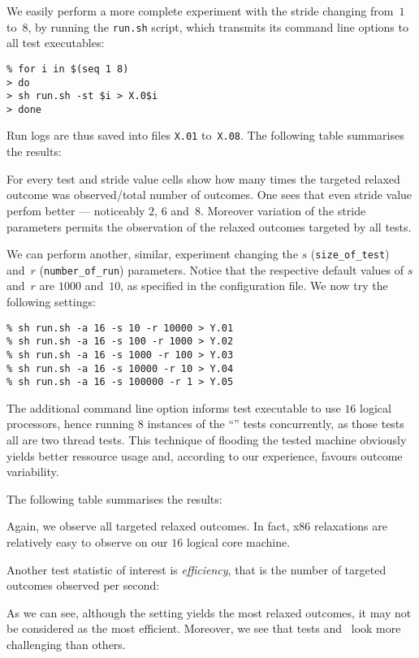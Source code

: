 We easily perform a more complete experiment with the stride changing
from~$1$ to~$8$, by running the \texttt{run.sh} script,
which transmits its command line options to all test executables:
\begin{verbatim}
% for i in $(seq 1 8)
> do
> sh run.sh -st $i > X.0$i
> done
\end{verbatim}
Run logs are thus saved into files \texttt{X.01} to~\texttt{X.08}.
The following table summarises the results:
\begin{center}\let\handletest\xhandletest

\end{center}
For every test and stride value cells show how many times the targeted relaxed
outcome was observed/total number of outcomes.
One sees that even stride value perfom better --- noticeably $2$, $6$ and~$8$.
Moreover variation of the stride parameters permits the observation of
the relaxed outcomes targeted by all tests.


We can perform another, similar, experiment changing the $s$ (\verb+size_of_test+) and~$r$ (\verb+number_of_run+) parameters.
Notice that the respective default values of $s$ and~$r$ are
$1000$ and~$10$, as specified in the 
configuration file.
We now try the following settings:
\begin{verbatim}
% sh run.sh -a 16 -s 10 -r 10000 > Y.01
% sh run.sh -a 16 -s 100 -r 1000 > Y.02
% sh run.sh -a 16 -s 1000 -r 100 > Y.03
% sh run.sh -a 16 -s 10000 -r 10 > Y.04
% sh run.sh -a 16 -s 100000 -r 1 > Y.05
\end{verbatim}
The additional   command line option informs test executable
to use $16$ logical processors, hence running $8$ instances of
the ``'' tests concurrently, as those tests all are two thread tests.
This technique of flooding the tested machine obviously
yields better ressource usage
and, according to our experience, favours outcome variability.

The following table summarises the results:
\begin{center}\let\handletest\xhandletest

\end{center}
Again, we observe all targeted relaxed outcomes. In fact,
x86 relaxations are relatively easy to observe on our $16$
logical core machine.

Another test statistic of interest is
\emph{efficiency}, that is the number of targeted outcomes observed per
second:
\begin{center}\let\handletest\xhandletest

\end{center}
As we can see, although the setting  yields the most
relaxed outcomes, it may not be considered as the most efficient.
Moreover, we see that tests  and~
look more challenging than others.

